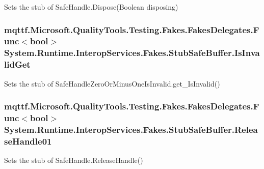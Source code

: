 Sets the stub of Safe\-Handle.\-Dispose(\-Boolean disposing)

\hypertarget{class_system_1_1_runtime_1_1_interop_services_1_1_fakes_1_1_stub_safe_buffer_a072ee2586b9c4b7c95c07bf1e82f2147}{
\subsubsection[{Is\-Invalid\-Get}]{\setlength{\rightskip}{0pt plus 5cm}mqttf.\-Microsoft.\-Quality\-Tools.\-Testing.\-Fakes.\-Fakes\-Delegates.\-Func$<$bool$>$ System.\-Runtime.\-Interop\-Services.\-Fakes.\-Stub\-Safe\-Buffer.\-Is\-Invalid\-Get}}\label{class_system_1_1_runtime_1_1_interop_services_1_1_fakes_1_1_stub_safe_buffer_a072ee2586b9c4b7c95c07bf1e82f2147}


Sets the stub of Safe\-Handle\-Zero\-Or\-Minus\-One\-Is\-Invalid.\-get\-\_\-\-Is\-Invalid()

\hypertarget{class_system_1_1_runtime_1_1_interop_services_1_1_fakes_1_1_stub_safe_buffer_afdeec0cc1516104d93d0839e5465f72c}{
\subsubsection[{Release\-Handle01}]{\setlength{\rightskip}{0pt plus 5cm}mqttf.\-Microsoft.\-Quality\-Tools.\-Testing.\-Fakes.\-Fakes\-Delegates.\-Func$<$bool$>$ System.\-Runtime.\-Interop\-Services.\-Fakes.\-Stub\-Safe\-Buffer.\-Release\-Handle01}}\label{class_system_1_1_runtime_1_1_interop_services_1_1_fakes_1_1_stub_safe_buffer_afdeec0cc1516104d93d0839e5465f72c}


Sets the stub of Safe\-Handle.\-Release\-Handle()



